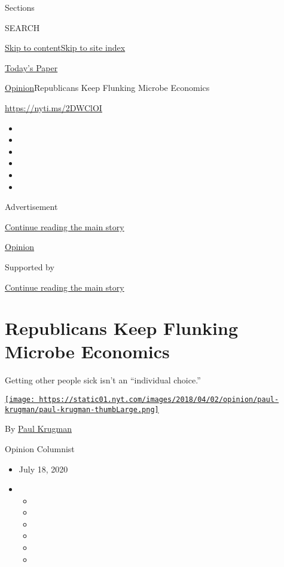 Sections

SEARCH

\protect\hyperlink{site-content}{Skip to
content}\protect\hyperlink{site-index}{Skip to site index}

\href{https://myaccount.nytimes.com/auth/login?response_type=cookie\&client_id=vi}{}

\href{https://www.nytimes.com/section/todayspaper}{Today's Paper}

\href{/section/opinion}{Opinion}\textbar{}Republicans Keep Flunking
Microbe Economics

\href{https://nyti.ms/2DWClOI}{https://nyti.ms/2DWClOI}

\begin{itemize}
\item
\item
\item
\item
\item
\item
\end{itemize}

Advertisement

\protect\hyperlink{after-top}{Continue reading the main story}

\href{/section/opinion}{Opinion}

Supported by

\protect\hyperlink{after-sponsor}{Continue reading the main story}

\hypertarget{republicans-keep-flunking-microbe-economics}{%
\section{Republicans Keep Flunking Microbe
Economics}\label{republicans-keep-flunking-microbe-economics}}

Getting other people sick isn't an ``individual choice.''

\href{https://www.nytimes.com/by/paul-krugman}{\texttt{[image: https://static01.nyt.com/images/2018/04/02/opinion/paul-krugman/paul-krugman-thumbLarge.png]}}

By \href{https://www.nytimes.com/by/paul-krugman}{Paul Krugman}

Opinion Columnist

\begin{itemize}
\item
  July 18, 2020
\item
  \begin{itemize}
  \item
  \item
  \item
  \item
  \item
  \item
  \end{itemize}
\end{itemize}

